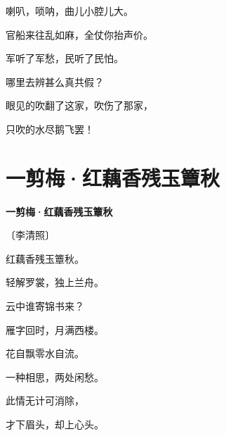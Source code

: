 \documentclass[12pt,UTF-8,openany,fontset=none]{ctexbook}
\begin{document}
\begin{center}
    \begin{Large}

        喇叭，唢呐，曲儿小腔儿大。

        官船来往乱如麻，全仗你抬声价。

        \vspace{18pt}  %

        军听了军愁，民听了民怕。

        哪里去辨甚么真共假？

        \vspace{18pt}  %

        眼见的吹翻了这家，吹伤了那家，

        只吹的水尽鹅飞罢！

    \end{Large}

\end{center}

\vspace{8pt}
\clearpage

\section{一剪梅·红藕香残玉簟秋}


\begin{center}
    {\bfseries 一剪梅·红藕香残玉簟秋}

    \vspace{18pt}

    \begin{large}\xuwen
        〔李清照〕
    \end{large}

\end{center}

    \vspace{18pt}  %

\begin{center}
    \begin{Large}

        红藕香残玉簟秋。

        轻解罗裳，独上兰舟。

        云中谁寄锦书来？

        雁字回时，月满西楼。

        \vspace{18pt}  %

        花自飘零水自流。

        一种相思，两处闲愁。

        此情无计可消除，

        才下眉头，却上心头。

    \end{Large}

\end{center}
\end{document}
